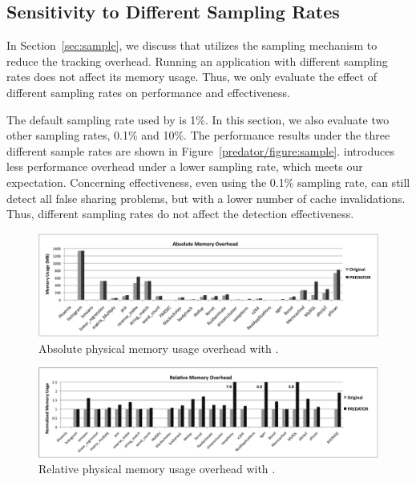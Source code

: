 \subsection{Sensitivity to Different Sampling Rates}
\label{sec:sensitivity}
In Section~\ref{sec:sample}, we discuss that \Predator{} utilizes the sampling mechanism to reduce the tracking overhead. Running an application with different sampling rates does not affect its memory usage. Thus, we only evaluate the effect of different sampling rates on performance and effectiveness. 

The default sampling rate used by \Predator{} is 1\%. In this section, we also evaluate two other sampling rates, 0.1\% and 10\%. The performance results under the three different sample rates are shown in Figure~\ref{predator/figure:sample}. \Predator{} introduces less performance overhead under a lower sampling rate, which meets our expectation. Concerning effectiveness, even using the 0.1\% sampling rate, \Predator{} can still detect all false sharing problems, but with a lower number of cache invalidations. Thus, different sampling rates do not affect the detection effectiveness.
 
\begin{figure}[!t]
\centering
\includegraphics[width=6in]{predator/figure/absolutememory}
\caption{Absolute physical memory usage overhead with \Predator{}.}
\label{fig:absolutememusage}
\end{figure}

\begin{figure}[!t]
\centering
\includegraphics[width=6in]{predator/figure/memusage}
\caption{Relative physical memory usage overhead with \Predator{}.}
\label{fig:memusage}
\end{figure}

